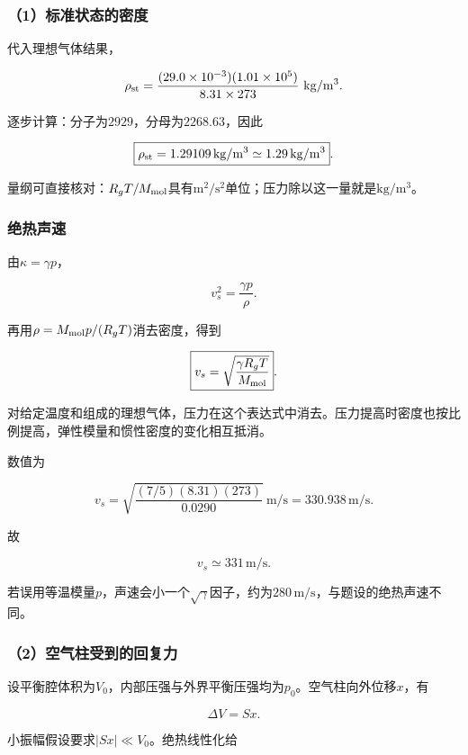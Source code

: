 \documentclass[12pt,a4paper,fontset=fandol]{ctexart}
\begin{document}
\subsubsection{（1）标准状态的密度}\label{ux6807ux51c6ux72b6ux6001ux7684ux5bc6ux5ea6}

代入理想气体结果，

\[
\rho_{\rm st}
=\frac{(29.0\times10^{-3})(1.01\times10^5)}
{8.31\times273}
\ \mathrm{kg/m^3}.
\]

逐步计算：分子为\(2929\)，分母为\(2268.63\)，因此

\[
\boxed{\rho_{\rm st}=1.29109\,\mathrm{kg/m^3}
\simeq1.29\,\mathrm{kg/m^3}}.
\]

量纲可直接核对：\(R_gT/M_{\rm mol}\)具有\(\mathrm{m^2/s^2}\)单位；压力除以这一量就是\(\mathrm{kg/m^3}\)。

\subsubsection{绝热声速}\label{ux7eddux70edux58f0ux901f}

由\(\kappa=\gamma p\)，

\[
v_s^2=\frac{\gamma p}{\rho}.
\]

再用\(\rho=M_{\rm mol}p/(R_gT)\)消去密度，得到

\[
\boxed{v_s=\sqrt{\frac{\gamma R_gT}{M_{\rm mol}}}}.
\]

对给定温度和组成的理想气体，压力在这个表达式中消去。压力提高时密度也按比例提高，弹性模量和惯性密度的变化相互抵消。

数值为

\[
v_s=
\sqrt{\frac{(7/5)(8.31)(273)}{0.0290}}
\ \mathrm{m/s}
=330.938\,\mathrm{m/s}.
\]

故

\[
\boxed{v_s\simeq331\,\mathrm{m/s}}.
\]

若误用等温模量\(p\)，声速会小一个\(\sqrt\gamma\)因子，约为\(280\,\mathrm{m/s}\)，与题设的绝热声速不同。

\subsubsection{（2）空气柱受到的回复力}\label{ux7a7aux6c14ux67f1ux53d7ux5230ux7684ux56deux590dux529b}

设平衡腔体积为\(V_0\)，内部压强与外界平衡压强均为\(p_0\)。空气柱向外位移\(x\)，有

\[
\Delta V=Sx.
\]

小振幅假设要求\(|Sx|\ll V_0\)。绝热线性化给
\end{document}
